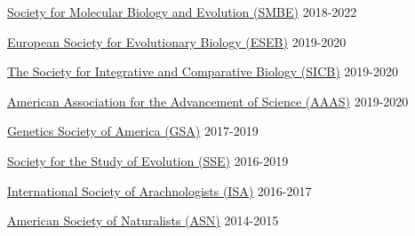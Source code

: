 

\begin{cvmemberships}

  \cvmembership
    {\href{https://smbe.org/}{Society for Molecular Biology and Evolution (SMBE)}} %
    {} %
    {2018-2022} %
    
  \cvmembership
    {\href{https://eseb.org/}{European Society for Evolutionary Biology (ESEB)}}
    {}
    {2019-2020}
  
  \cvmembership
    {\href{http://www.sicb.org/}{The Society for Integrative and Comparative Biology (SICB)}} %
    {}   %
    {2019-2020} %
    
  \cvmembership
    {\href{https://www.aaas.org/}{American Association for the Advancement of Science (AAAS)}} %
    {} %
    {2019-2020} %

  \cvmembership
    {\href{https://genetics-gsa.org/}{Genetics Society of America (GSA)}} %
    {} %
    {2017-2019} %

  \cvmembership
    {\href{https://www.evolutionsociety.org/}{Society for the Study of Evolution (SSE)}} %
    {} %
    {2016-2019} %

    
  \cvmembership
    {\href{https://arachnology.org/}{International Society of Arachnologists (ISA)}}
    {}
    {2016-2017}
    
  \cvmembership
     {\href{https://www.amnat.org/}{American Society of Naturalists (ASN)}}
     {}
     {2014-2015} 

\end{cvmemberships}
